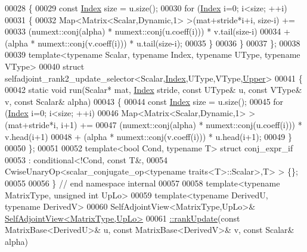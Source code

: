 \begin{DoxyCode}
00028   \{
00029     \textcolor{keyword}{const} \hyperlink{namespace_eigen_a62e77e0933482dafde8fe197d9a2cfde}{Index} size = u.size();
00030     \textcolor{keywordflow}{for} (\hyperlink{namespace_eigen_a62e77e0933482dafde8fe197d9a2cfde}{Index} i=0; i<size; ++i)
00031     \{
00032       Map<Matrix<Scalar,Dynamic,1> >(mat+stride*i+i, size-i) +=
00033                         (numext::conj(alpha) * numext::conj(u.coeff(i))) * v.tail(size-i)
00034                       + (alpha * numext::conj(v.coeff(i))) * u.tail(size-i);
00035     \}
00036   \}
00037 \};
00038 
00039 \textcolor{keyword}{template}<\textcolor{keyword}{typename} Scalar, \textcolor{keyword}{typename} Index, \textcolor{keyword}{typename} UType, \textcolor{keyword}{typename} VType>
00040 \textcolor{keyword}{struct }selfadjoint\_rank2\_update\_selector<Scalar,\hyperlink{namespace_eigen_a62e77e0933482dafde8fe197d9a2cfde}{Index},UType,VType,\hyperlink{group__enums_gga39e3366ff5554d731e7dc8bb642f83cda6bcb58be3b8b8ec84859ce0c5ac0aaec}{Upper}>
00041 \{
00042   \textcolor{keyword}{static} \textcolor{keywordtype}{void} run(Scalar* mat, \hyperlink{namespace_eigen_a62e77e0933482dafde8fe197d9a2cfde}{Index} stride, \textcolor{keyword}{const} UType& u, \textcolor{keyword}{const} VType& v, \textcolor{keyword}{const} Scalar& alpha)
00043   \{
00044     \textcolor{keyword}{const} \hyperlink{namespace_eigen_a62e77e0933482dafde8fe197d9a2cfde}{Index} size = u.size();
00045     \textcolor{keywordflow}{for} (\hyperlink{namespace_eigen_a62e77e0933482dafde8fe197d9a2cfde}{Index} i=0; i<size; ++i)
00046       Map<Matrix<Scalar,Dynamic,1> >(mat+stride*i, i+1) +=
00047                         (numext::conj(alpha)  * numext::conj(u.coeff(i))) * v.head(i+1)
00048                       + (alpha * numext::conj(v.coeff(i))) * u.head(i+1);
00049   \}
00050 \};
00051 
00052 \textcolor{keyword}{template}<\textcolor{keywordtype}{bool} Cond, \textcolor{keyword}{typename} T> \textcolor{keyword}{struct }conj\_expr\_if
00053   : conditional<!Cond, const T&,
00054       CwiseUnaryOp<scalar\_conjugate\_op<typename traits<T>::Scalar>,T> > \{\};
00055 
00056 \} \textcolor{comment}{// end namespace internal}
00057 
00058 \textcolor{keyword}{template}<\textcolor{keyword}{typename} MatrixType, \textcolor{keywordtype}{unsigned} \textcolor{keywordtype}{int} UpLo>
00059 \textcolor{keyword}{template}<\textcolor{keyword}{typename} DerivedU, \textcolor{keyword}{typename} DerivedV>
00060 SelfAdjointView<MatrixType,UpLo>& \hyperlink{group___core___module_a4739585861baa13b25dcce5ed6658311}{SelfAdjointView<MatrixType,UpLo>}
00061 \hyperlink{group___core___module_a4739585861baa13b25dcce5ed6658311}{::rankUpdate}(\textcolor{keyword}{const} MatrixBase<DerivedU>& u, \textcolor{keyword}{const} MatrixBase<DerivedV>& v, \textcolor{keyword}{const} Scalar& alpha)

\end{DoxyCode}
